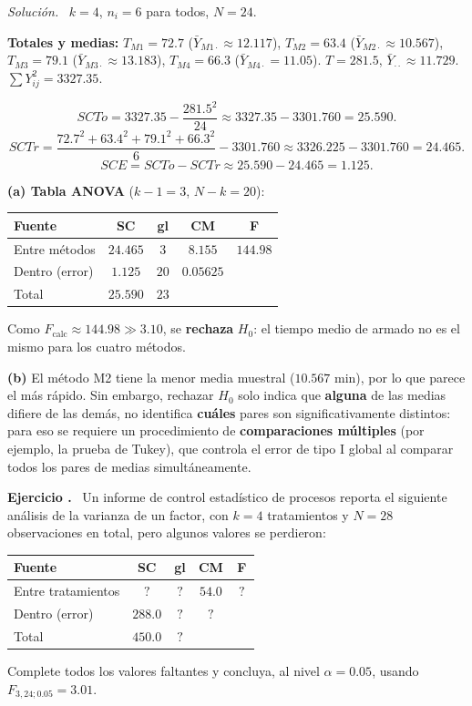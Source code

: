 \documentclass[11pt,a4paper]{article}
\newcounter{ejnum}
\newenvironment{ejercicio}{\refstepcounter{ejnum}\par\medskip\noindent\textbf{Ejercicio \theejnum.}~}{\par}
\newenvironment{solucion}{\par\noindent\textit{Solución.}~}{\par\vspace{1em}}
\begin{document}
\begin{solucion}
$k=4$, $n_i=6$ para todos, $N=24$.

\textbf{Totales y medias:} $T_{M1}=72.7$ ($\bar Y_{M1\cdot}\approx12.117$), $T_{M2}=63.4$ ($\bar Y_{M2\cdot}\approx10.567$), $T_{M3}=79.1$ ($\bar Y_{M3\cdot}\approx13.183$), $T_{M4}=66.3$ ($\bar Y_{M4\cdot}=11.05$). $T=281.5$, $\bar Y_{\cdot\cdot}\approx11.729$. $\sum Y_{ij}^2=3327.35$.

\[
SCTo=3327.35-\frac{281.5^2}{24}\approx3327.35-3301.760=25.590.
\]
\[
SCTr=\frac{72.7^2+63.4^2+79.1^2+66.3^2}{6}-3301.760\approx3326.225-3301.760=24.465.
\]
\[
SCE=SCTo-SCTr\approx25.590-24.465=1.125.
\]

\textbf{(a) Tabla ANOVA} ($k-1=3$, $N-k=20$):
\begin{table}[htbp]
\centering
\begin{tabular}{lcccc}
\toprule
Fuente & SC & gl & CM & F \\
\midrule
Entre métodos & $24.465$ & $3$ & $8.155$ & $144.98$ \\
Dentro (error) & $1.125$ & $20$ & $0.05625$ & \\
\midrule
Total & $25.590$ & $23$ & & \\
\bottomrule
\end{tabular}
\end{table}

Como $F_{\text{calc}}\approx144.98\gg3.10$, se \textbf{rechaza} $H_0$: el tiempo medio de armado no es el mismo para los cuatro métodos.

\textbf{(b)} El método M2 tiene la menor media muestral ($10.567$ min), por lo que parece el más rápido. Sin embargo, rechazar $H_0$ solo indica que \textbf{alguna} de las medias difiere de las demás, no identifica \textbf{cuáles} pares son significativamente distintos: para eso se requiere un procedimiento de \textbf{comparaciones múltiples} (por ejemplo, la prueba de Tukey), que controla el error de tipo I global al comparar todos los pares de medias simultáneamente.
\end{solucion}

\begin{ejercicio}
Un informe de control estadístico de procesos reporta el siguiente análisis de la varianza de un factor, con $k=4$ tratamientos y $N=28$ observaciones en total, pero algunos valores se perdieron:

\begin{table}[htbp]
\centering
\begin{tabular}{lcccc}
\toprule
Fuente & SC & gl & CM & F \\
\midrule
Entre tratamientos & $\ ?\ $ & $\ ?\ $ & $54.0$ & $\ ?\ $ \\
Dentro (error) & $288.0$ & $\ ?\ $ & $\ ?\ $ & \\
\midrule
Total & $450.0$ & $\ ?\ $ & & \\
\bottomrule
\end{tabular}
\end{table}

Complete todos los valores faltantes y concluya, al nivel $\alpha=0.05$, usando $F_{3,24;0.05}=3.01$.
\end{ejercicio}
\end{document}

